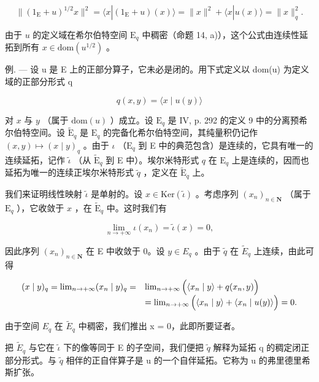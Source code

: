 \[
\| (1 _ {\mathrm{E}} + u) ^ {1 / 2} x \| ^ {2} = \langle x | (1 _ {\mathrm{E}} + u) (x) \rangle = \| x \| ^ {2} + \langle x | u (x) \rangle = \| x \| _ {q} ^ {2}.
\]

由于 \(u\) 的定义域在希尔伯特空间 \(\mathrm{E}_q\) 中稠密（命题 14, a)），这个公式由连续性延拓到所有 \(x \in \mathrm{dom}(u^{1/2})\) 。

例. --- 设 u 是 E 上的正部分算子，它未必是闭的。用下式定义以 dom(u) 为定义域的正部分形式 q

\[
q (x, y) = \langle x \mid u (y) \rangle
\]

对 \(x\) 与 \(y\) （属于 \(\mathrm{dom}(u)\) ）成立。设 \(\mathrm{E}_q\) 是 IV, p. 292 的定义 9 中的分离预希尔伯特空间。设 \(\widetilde{\mathrm{E}}_q\) 是 \(\mathrm{E}_q\) 的完备化希尔伯特空间，其纯量积仍记作 \((x,y) \mapsto (x \mid y)_q\) 。由于 \(\iota\) （\(\mathrm{E}_q\) 到 E 中的典范包含）是连续的，它具有唯一的连续延拓，记作 \(\widetilde{\iota}\) （从 \(\widetilde{\mathrm{E}}_q\) 到 E 中）。埃尔米特形式 \(q\) 在 \(\mathrm{E}_q\) 上是连续的，因而也延拓为唯一的连续正埃尔米特形式 \(\widetilde{q}\) ，定义在 \(\widetilde{\mathrm{E}}_q\) 上。

我们来证明线性映射 \(\widetilde{\iota}\) 是单射的。设 \(x\in\mathrm{Ker}(\widetilde{\iota})\) 。考虑序列 \((x_{n})_{n\in\mathbf{N}}\) （属于 \(\mathrm{E}_{q}\) ），它收敛于 \(x\) ，在 \(\widetilde{\mathrm{E}}_{q}\) 中。这时我们有

\[
\lim _ {n \to + \infty} \iota (x _ {n}) = \widetilde {\iota} (x) = 0,
\]

因此序列 \((x_{n})_{n\in\mathbf{N}}\) 在 E 中收敛于 0。设 \(y\in E_{q}\) 。由于 \(\widetilde{q}\) 在 \(\widetilde{E}_{q}\) 上连续，由此可得

\[
\begin{array}{r l} (x \mid y) _ {q} = \lim _ {n \to + \infty} (x _ {n} \mid y) _ {q} = & \lim _ {n \to + \infty} \Big (\langle x _ {n} \mid y \rangle + q (x _ {n}, y) \Big) \\ & = \lim _ {n \to + \infty} \Big (\langle x _ {n} \mid y \rangle + \langle x _ {n} \mid u (y) \rangle \Big) = 0. \end{array}
\]

由于空间 \(E_{q}\) 在 \(\widetilde{E}_{q}\) 中稠密，我们推出 x = 0，此即所要证者。

把 \(\widetilde{E}_{q}\) 与它在 \(\widetilde{\iota}\) 下的像等同于 E 的子空间，我们便把 \(\widetilde{q}\) 解释为延拓 q 的稠定闭正部分形式。与 \(\widetilde{q}\) 相伴的正自伴算子是 u 的一个自伴延拓。它称为 u 的弗里德里希斯扩张。

